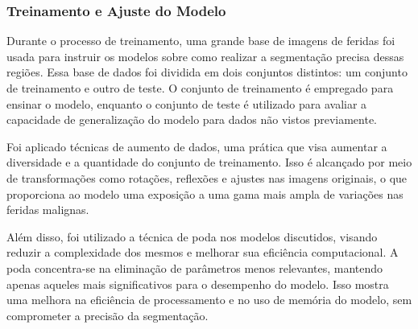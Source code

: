     \subsubsection{Treinamento e Ajuste do Modelo}
    
        Durante o processo de treinamento, uma grande base de imagens de feridas foi usada para instruir os modelos sobre como realizar a segmentação precisa dessas regiões. Essa base de dados foi dividida em dois conjuntos distintos: um conjunto de treinamento e outro de teste. O conjunto de treinamento é empregado para ensinar o modelo, enquanto o conjunto de teste é utilizado para avaliar a capacidade de generalização do modelo para dados não vistos previamente.
    
        Foi aplicado técnicas de aumento de dados, uma prática que visa aumentar a diversidade e a quantidade do conjunto de treinamento. Isso é alcançado por meio de transformações como rotações, reflexões e ajustes nas imagens originais, o que proporciona ao modelo uma exposição a uma gama mais ampla de variações nas feridas malignas.
    
        Além disso, foi utilizado a técnica de poda nos modelos discutidos, visando reduzir a complexidade dos mesmos e melhorar sua eficiência computacional. A poda concentra-se na eliminação de parâmetros menos relevantes, mantendo apenas aqueles mais significativos para o desempenho do modelo. Isso mostra uma melhora na eficiência de processamento e no uso de memória do modelo, sem comprometer a precisão da segmentação.
    
    
